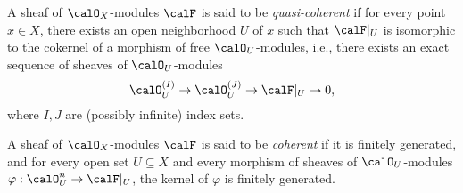     \begin{definition}\label{def:quasi_coherent_sheaves}
        A sheaf of \(\calO_X\)-modules \(\calF\) is said to be \emph{quasi-coherent} if for every point \(x \in X\), there exists an open neighborhood \(U\) of \(x\) such that \(\calF|_U\) is isomorphic to the cokernel of a morphism of free \(\calO_U\)-modules, i.e., there exists an exact sequence of sheaves of \(\calO_U\)-modules
        \[
            \calO_U^{(I)} \to \calO_U^{(J)} \to \calF|_U \to 0,
        \]
        where \(I,J\) are (possibly infinite) index sets.
        
    \end{definition}

    \begin{definition}\label{def:coherent_sheaves}
        A sheaf of \(\calO_X\)-modules \(\calF\) is said to be \emph{coherent} if it is finitely generated, and for every open set \(U \subseteq X\) and every morphism of sheaves of \(\calO_U\)-modules \(\varphi:\calO_U^n \to \calF|_U\), the kernel of \(\varphi\) is finitely generated.
    \end{definition}


